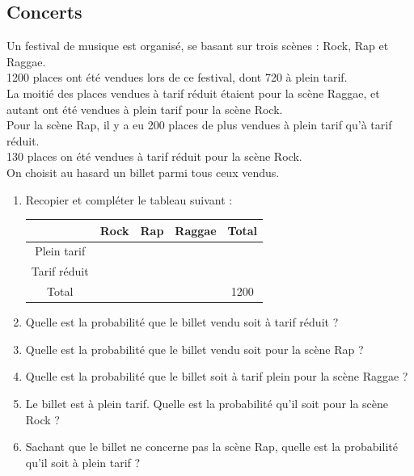\documentclass[oneside,12pt]{book}          %
\begin{document}
\subsection{Concerts}

Un festival de musique est organisé, se basant sur trois scènes : Rock, Rap et Raggae.\\
1200 places ont été vendues lors de ce festival, dont 720 à plein tarif.\\
La moitié des places vendues à tarif réduit étaient pour la scène Raggae, et autant ont été vendues à plein tarif pour la scène Rock.\\
Pour la scène Rap, il y a eu 200 places de plus vendues à plein tarif qu'à tarif réduit.\\
130 places on été vendues à tarif réduit pour la scène Rock.\\[5pt]
On choisit au hasard un billet parmi tous ceux vendus.

\begin{enumerate}
    \item Recopier et compléter le tableau suivant :
    \renewcommand{\arraystretch}{1.5}
        \begin{center}
        	\setlength{\tabcolsep}{16pt}
            \begin{tabular}{|c|c|c|c|c|}\hline
                & Rock & Rap & Raggae & Total\\ \hline
                Plein tarif & & & & \\ \hline
                Tarif réduit & & & & \\ \hline
                Total & & & & 1200 \\ \hline
            \end{tabular}    
        \end{center}    
    \item Quelle est la probabilité que le billet vendu soit à tarif réduit ?
    \item Quelle est la probabilité que le billet vendu soit pour la scène Rap ?
    \item Quelle est la probabilité que le billet soit à tarif plein pour la scène Raggae ?
    \item Le billet est à plein tarif. Quelle est la probabilité qu'il soit pour la scène Rock ?
    \item Sachant que le billet ne concerne pas la scène Rap, quelle est la probabilité qu'il soit à plein tarif ?
\end{enumerate}
\end{document}
